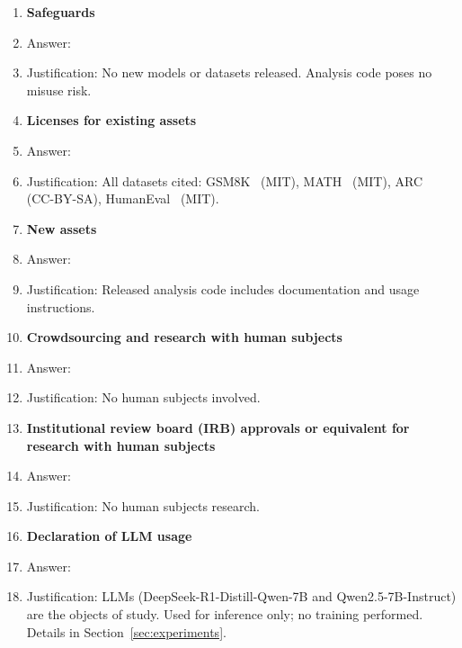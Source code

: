 \begin{enumerate}
\item {\bf Safeguards}
    \item[] Answer: \answerNA{}
    \item[] Justification: No new models or datasets released. Analysis code poses no misuse risk.

\item {\bf Licenses for existing assets}
    \item[] Answer: \answerYes{}
    \item[] Justification: All datasets cited: GSM8K~\citep{gsm8k} (MIT), MATH~\citep{math} (MIT), ARC~\citep{clark2018arc} (CC-BY-SA), HumanEval~\citep{chen2021humaneval} (MIT).

\item {\bf New assets}
    \item[] Answer: \answerYes{}
    \item[] Justification: Released analysis code includes documentation and usage instructions.

\item {\bf Crowdsourcing and research with human subjects}
    \item[] Answer: \answerNA{}
    \item[] Justification: No human subjects involved.

\item {\bf Institutional review board (IRB) approvals or equivalent for research with human subjects}
    \item[] Answer: \answerNA{}
    \item[] Justification: No human subjects research.

\item {\bf Declaration of LLM usage}
    \item[] Answer: \answerYes{}
    \item[] Justification: LLMs (DeepSeek-R1-Distill-Qwen-7B and Qwen2.5-7B-Instruct) are the objects of study. Used for inference only; no training performed. Details in Section~\ref{sec:experiments}.

\end{enumerate}

